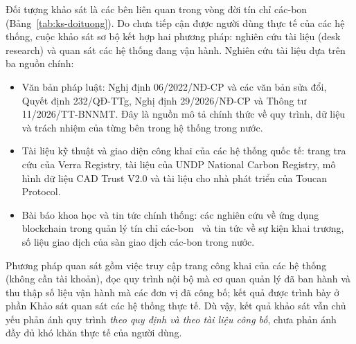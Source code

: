 Đối tượng khảo sát là các bên liên quan trong vòng đời tín chỉ các-bon (Bảng~\ref{tab:ks-doituong}). Do chưa tiếp cận được người dùng thực tế của các hệ thống, cuộc khảo sát sơ bộ kết hợp hai phương pháp: nghiên cứu tài liệu (desk research) và quan sát các hệ thống đang vận hành. Nghiên cứu tài liệu dựa trên ba nguồn chính:
\begin{itemize}
    \item Văn bản pháp luật: Nghị định 06/2022/NĐ-CP và các văn bản sửa đổi, Quyết định 232/QĐ-TTg, Nghị định 29/2026/NĐ-CP và Thông tư 11/2026/TT-BNNMT. Đây là nguồn mô tả chính thức về quy trình, dữ liệu và trách nhiệm của từng bên trong hệ thống trong nước.
    \item Tài liệu kỹ thuật và giao diện công khai của các hệ thống quốc tế: trang tra cứu của Verra Registry, tài liệu của UNDP National Carbon Registry, mô hình dữ liệu CAD Trust V2.0 và tài liệu cho nhà phát triển của Toucan Protocol.
    \item Bài báo khoa học và tin tức chính thống: các nghiên cứu về ứng dụng blockchain trong quản lý tín chỉ các-bon~\cite{vaccargiu2026blockchain} \cite{tsai2024blockchain} và tin tức về sự kiện khai trương, số liệu giao dịch của sàn giao dịch các-bon trong nước.
\end{itemize}
Phương pháp quan sát gồm việc truy cập trang công khai của các hệ thống (không cần tài khoản), đọc quy trình nội bộ mà cơ quan quản lý đã ban hành và thu thập số liệu vận hành mà các đơn vị đã công bố; kết quả được trình bày ở phần Khảo sát quan sát các hệ thống thực tế. Dù vậy, kết quả khảo sát vẫn chủ yếu phản ánh quy trình \emph{theo quy định và theo tài liệu công bố}, chưa phản ánh đầy đủ khó khăn thực tế của người dùng.

